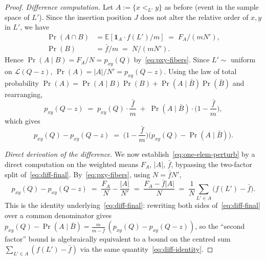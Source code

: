 \begin{proof}
\smallskip\noindent\emph{Difference computation.} Let
$A := \{x <_{L'} y\}$ as before (event in the sample space of
$L'$). Since the insertion position $J$ does not alter the relative
order of $x, y$ in $L'$, we have
\begin{align*}
  \Pr(A \cap B) &= \mathbb E\!\left[\mathbf 1_A \cdot f(L')/m\right]
  \;=\; F_A/(mN'),\\
  \Pr(B) &= \bar f/m \;=\; N/(mN').
\end{align*}
Hence $\Pr(A \mid B) = F_A/N = p_{xy}(Q)$ by~\eqref{eq:pxy-fibers}.
Since $L' \sim$ uniform on $\mathcal L(Q-z)$, $\Pr(A) = |A|/N'
= p_{xy}(Q-z)$. Using the law of total probability
$\Pr(A) = \Pr(A \mid B)\Pr(B) + \Pr(A \mid \bar B)\Pr(\bar B)$ and
rearranging,
\begin{equation}\label{eq:total-prob}
  p_{xy}(Q-z) \;=\; p_{xy}(Q)\cdot\frac{\bar f}{m}
  \;+\; \Pr(A \mid \bar B)\cdot\Big(1 - \frac{\bar f}{m}\Big),
\end{equation}
which gives
\begin{equation}\label{eq:diff-final}
  p_{xy}(Q) - p_{xy}(Q-z)
  \;=\; \Big(1 - \frac{\bar f}{m}\Big)\Big(p_{xy}(Q) - \Pr(A\mid\bar B)\Big).
\end{equation}

\smallskip\noindent\emph{Direct derivation of the difference.} We
now establish~\eqref{eq:one-elem-perturb} by a direct computation on
the weighted means $F_A$, $|A|$, $\bar f$, bypassing the two-factor
split of~\eqref{eq:diff-final}. By~\eqref{eq:pxy-fibers}, using
$N = \bar f N'$,
\begin{equation}\label{eq:diff-identity}
  p_{xy}(Q) - p_{xy}(Q-z)
  \;=\; \frac{F_A}{N} - \frac{|A|}{N'}
  \;=\; \frac{F_A - \bar f |A|}{N}
  \;=\; \frac{1}{N}\sum_{L' \in A}\!\bigl(f(L') - \bar f\bigr).
\end{equation}
This is the identity underlying~\eqref{eq:diff-final}: rewriting both
sides of~\eqref{eq:diff-final} over a common denominator gives
$p_{xy}(Q) - \Pr(A \mid \bar B) = \frac{m}{m - \bar f}\,
(p_{xy}(Q) - p_{xy}(Q-z))$, so the ``second factor'' bound is
algebraically equivalent to a bound on the centred sum
$\sum_{L' \in A}(f(L') - \bar f)$ via the same
quantity~\eqref{eq:diff-identity}.


\end{proof}
